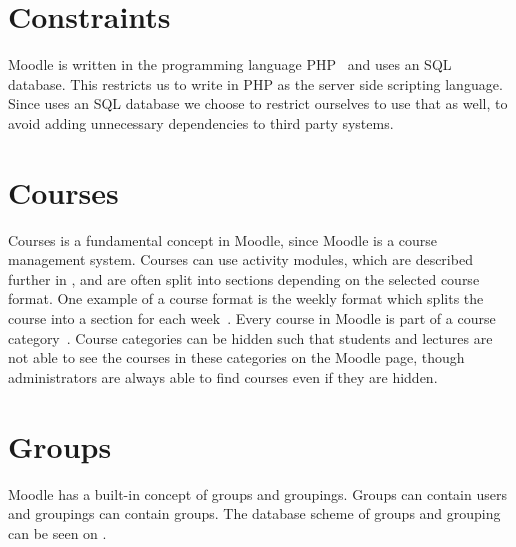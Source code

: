 \section{Constraints}
\label{sub:constraints}
Moodle is written in the programming language PHP~\cite{moodleabout} and uses an SQL database.
This restricts us to write \system{} in PHP as the server side scripting language.
Since \moodle{} uses an SQL database we choose to restrict ourselves to use that as well, to avoid adding unnecessary dependencies to third party systems.


\section{Courses}
\label{sub:courses}
Courses is a fundamental concept in Moodle, since Moodle is a course management system.
Courses can use activity modules, which are described further in , and are often split into sections depending on the selected course format.
One example of a course format is the weekly format which splits the course into a section for each week~\cite{moodlecourseformat}.
Every course in Moodle is part of a course category~\cite{moodlecoursecategories}. 
Course categories can be hidden such that students and lectures are not able to see the courses in these categories on the Moodle page, though administrators are always able to find courses even if they are hidden.


\section{Groups}
\label{sec:groups}
Moodle has a built-in concept of groups and groupings. 
Groups can contain users and groupings can contain groups. 
The database scheme of groups and grouping can be seen on .

